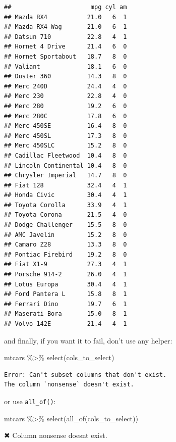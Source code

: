 \documentclass[
]{article}
\newenvironment{Shaded}{\begin{snugshade}}{\end{snugshade}}
\newcommand{\AttributeTok}[1]{\textcolor[rgb]{0.77,0.63,0.00}{#1}}
\newcommand{\FunctionTok}[1]{\textcolor[rgb]{0.00,0.00,0.00}{#1}}
\newcommand{\NormalTok}[1]{#1}
\newcommand{\SpecialCharTok}[1]{\textcolor[rgb]{0.00,0.00,0.00}{#1}}
\newcommand{\StringTok}[1]{\textcolor[rgb]{0.31,0.60,0.02}{#1}}
\begin{document}
\begin{verbatim}
##                      mpg cyl am
## Mazda RX4           21.0   6  1
## Mazda RX4 Wag       21.0   6  1
## Datsun 710          22.8   4  1
## Hornet 4 Drive      21.4   6  0
## Hornet Sportabout   18.7   8  0
## Valiant             18.1   6  0
## Duster 360          14.3   8  0
## Merc 240D           24.4   4  0
## Merc 230            22.8   4  0
## Merc 280            19.2   6  0
## Merc 280C           17.8   6  0
## Merc 450SE          16.4   8  0
## Merc 450SL          17.3   8  0
## Merc 450SLC         15.2   8  0
## Cadillac Fleetwood  10.4   8  0
## Lincoln Continental 10.4   8  0
## Chrysler Imperial   14.7   8  0
## Fiat 128            32.4   4  1
## Honda Civic         30.4   4  1
## Toyota Corolla      33.9   4  1
## Toyota Corona       21.5   4  0
## Dodge Challenger    15.5   8  0
## AMC Javelin         15.2   8  0
## Camaro Z28          13.3   8  0
## Pontiac Firebird    19.2   8  0
## Fiat X1-9           27.3   4  1
## Porsche 914-2       26.0   4  1
## Lotus Europa        30.4   4  1
## Ford Pantera L      15.8   8  1
## Ferrari Dino        19.7   6  1
## Maserati Bora       15.0   8  1
## Volvo 142E          21.4   4  1
\end{verbatim}

and finally, if you want it to fail, don't use any helper:

\begin{Shaded}
\begin{Highlighting}[]
\NormalTok{mtcars }\SpecialCharTok{\%\textgreater{}\%}
  \FunctionTok{select}\NormalTok{(cols\_to\_select)}
\end{Highlighting}
\end{Shaded}

\begin{verbatim}
Error: Can't subset columns that don't exist.
The column `nonsense` doesn't exist.
\end{verbatim}

or use \texttt{all\_of()}:

\begin{Shaded}
\begin{Highlighting}[]
\NormalTok{mtcars }\SpecialCharTok{\%\textgreater{}\%}
  \FunctionTok{select}\NormalTok{(}\FunctionTok{all\_of}\NormalTok{(cols\_to\_select))}
\end{Highlighting}
\end{Shaded}

\begin{Shaded}
\begin{Highlighting}[]
\NormalTok{✖ Column }\StringTok{\textasciigrave{}}\AttributeTok{nonsense}\StringTok{\textasciigrave{}}\NormalTok{ doesn}\StringTok{\textquotesingle{}t exist.}
\end{Highlighting}
\end{Shaded}
\end{document}
